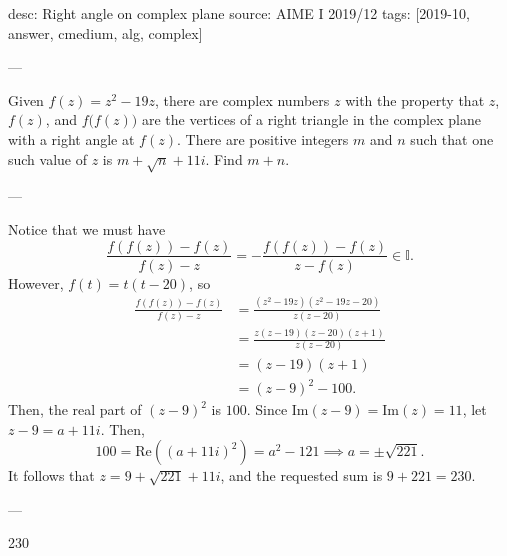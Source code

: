 desc: Right angle on complex plane
source: AIME I 2019/12
tags: [2019-10, answer, cmedium, alg, complex]

---

Given $f(z)=z^2-19z$, there are complex numbers $z$ with the property that $z$, $f(z)$, and $f\big(f(z)\big)$ are the vertices of a right triangle in the complex plane with a right angle at $f(z)$. There are positive integers $m$ and $n$ such that one such value of $z$ is $m+\sqrt n+11i$. Find $m+n$.

---

Notice that we must have \[\frac{f(f(z))-f(z)}{f(z)-z}=-\frac{f(f(z))-f(z)}{z-f(z)}\in\mathbb I.\]
However, $f(t)=t(t-20)$, so
\begin{align*}
    \frac{f(f(z))-f(z)}{f(z)-z}&=\frac{(z^2-19z)(z^2-19z-20)}{z(z-20)}\\
    &=\frac{z(z-19)(z-20)(z+1)}{z(z-20)}\\
    &=(z-19)(z+1)\\
    &=(z-9)^2-100.
\end{align*}
Then, the real part of $(z-9)^2$ is $100$. Since $\text{Im}(z-9)=\text{Im}(z)=11$, let $z-9=a+11i$. Then, \[100=\text{Re}((a+11i)^2)=a^2-121\implies a=\pm\sqrt{221}.\]
It follows that $z=9+\sqrt{221}+11i$, and the requested sum is $9+221=230$.

---

230
